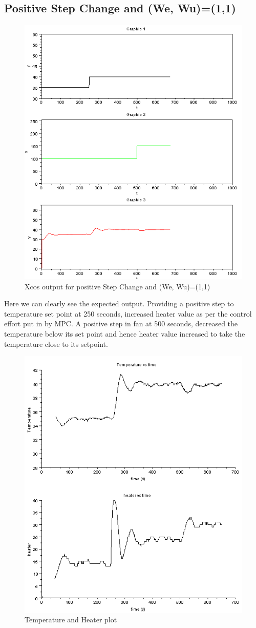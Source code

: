 \subsection{Positive Step Change and (We, Wu)=(1,1)}
\begin{figure}[H]
\centering
  \includegraphics[width=0.8\linewidth]{mpc/1_1.png}
  \caption{Xcos output for positive Step Change and (We, Wu)=(1,1)}
\end{figure}
Here we can clearly see the expected output. Providing a positive step to temperature set point at 250 seconds, increased heater value as per the control effort put in by MPC. A positive step in fan at 500 seconds, decreased the temperature below its set point and hence heater value increased to take the temperature close to its setpoint.
\begin{figure}[H]
\centering
  \includegraphics[width=0.8\linewidth]{mpc/1_1_heater_final.png}
  \caption{Temperature and Heater plot}
\end{figure}
